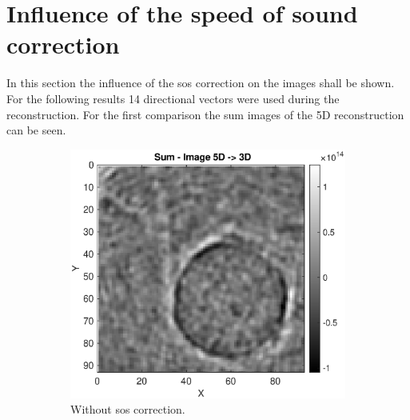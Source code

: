       
\section{Influence of the speed of sound correction }
In this section the influence of the \ac{sos} correction on the images shall be shown. For the following results 14 directional vectors were used during the reconstruction. For the first comparison the sum images of the 5D reconstruction can be seen.


\begin{figure}[H]
     \centering
     \begin{subfigure}[b]{0.47\textwidth}
                  \centering
         \includegraphics[width=1.09\textwidth]{Graphics/Results/14_vecs_sos_vs_noSos/sum_14vecs_no_sos_z_direction.eps}
         \caption{Without \ac{sos} correction.}
         \label{sos:influence_sum_images_without}
     \end{subfigure}
     \hfill
     \begin{subfigure}[b]{0.47\textwidth}
         \centering

\end{subfigure}
\end{figure}

